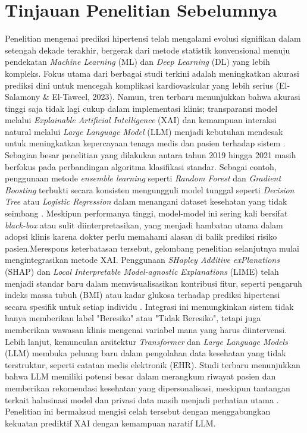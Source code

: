 \section{Tinjauan Penelitian Sebelumnya}
Penelitian mengenai prediksi hipertensi telah mengalami evolusi signifikan dalam setengah dekade terakhir, bergerak dari metode statistik konvensional menuju pendekatan \textit{Machine Learning} (ML) dan \textit{Deep Learning} (DL) yang lebih kompleks. Fokus utama dari berbagai studi terkini adalah meningkatkan akurasi prediksi dini untuk mencegah komplikasi kardiovaskular yang lebih serius (El-Salamony \& El-Taweel, 2023). Namun, tren terbaru menunjukkan bahwa akurasi tinggi saja tidak lagi cukup dalam implementasi klinis; transparansi model melalui \textit{Explainable Artificial Intelligence} (XAI) dan kemampuan interaksi natural melalui \textit{Large Language Model} (LLM) menjadi kebutuhan mendesak untuk meningkatkan kepercayaan tenaga medis dan pasien terhadap sistem \parencite{Clusmann2023Future}.
Sebagian besar penelitian yang dilakukan antara tahun 2019 hingga 2021 masih berfokus pada perbandingan algoritma klasifikasi standar. Sebagai contoh, penggunaan metode \textit{ensemble learning} seperti \textit{Random Forest} dan \textit{Gradient Boosting} terbukti secara konsisten mengungguli model tunggal seperti \textit{Decision Tree} atau \textit{Logistic Regression} dalam menangani dataset kesehatan yang tidak seimbang \parencite{Kusuma2022Comparative}. Meskipun performanya tinggi, model-model ini sering kali bersifat \textit{black-box} atau sulit diinterpretasikan, yang menjadi hambatan utama dalam adopsi klinis karena dokter perlu memahami alasan di balik prediksi risiko pasien.Merespons keterbatasan tersebut, gelombang penelitian selanjutnya mulai mengintegrasikan metode XAI. Penggunaan \textit{SHapley Additive exPlanations} (SHAP) dan \textit{Local Interpretable Model-agnostic Explanations} (LIME) telah menjadi standar baru dalam memvisualisasikan kontribusi fitur, seperti pengaruh indeks massa tubuh (BMI) atau kadar glukosa terhadap prediksi hipertensi secara spesifik untuk setiap individu \parencite{Miao2022Risk}. Integrasi ini memungkinkan sistem tidak hanya memberikan label "Beresiko" atau "Tidak Beresiko", tetapi juga memberikan wawasan klinis mengenai variabel mana yang harus diintervensi.
Lebih lanjut, kemunculan arsitektur \textit{Transformer} dan \textit{Large Language Models} (LLM) membuka peluang baru dalam pengolahan data kesehatan yang tidak terstruktur, seperti catatan medis elektronik (EHR). Studi terbaru menunjukkan bahwa LLM memiliki potensi besar dalam merangkum riwayat pasien dan memberikan rekomendasi kesehatan yang dipersonalisasi, meskipun tantangan terkait halusinasi model dan privasi data masih menjadi perhatian utama \parencite{Thirunavukarasu2023Large}. Penelitian ini bermaksud mengisi celah tersebut dengan menggabungkan kekuatan prediktif XAI dengan kemampuan naratif LLM.

